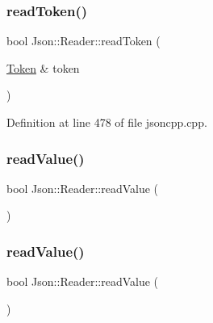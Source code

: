 \hypertarget{class_json_1_1_reader_a7cb0631963cc0fd4ff6ed0f570976864}{}\label{class_json_1_1_reader_a7cb0631963cc0fd4ff6ed0f570976864} 
\subsubsection{\texorpdfstring{read\+Token()}{readToken()}\hspace{0.1cm}{\footnotesize\ttfamily [2/2]}}
{\footnotesize\ttfamily bool Json\+::\+Reader\+::read\+Token (\begin{DoxyParamCaption}\item[{\hyperlink{class_json_1_1_reader_1_1_token}{Token} \&}]{token }\end{DoxyParamCaption})\hspace{0.3cm}{\ttfamily [private]}}



Definition at line 478 of file jsoncpp.\+cpp.

\hypertarget{class_json_1_1_reader_a47e56844b803d41ec993a83fadf4495c}{}\label{class_json_1_1_reader_a47e56844b803d41ec993a83fadf4495c} 
\subsubsection{\texorpdfstring{read\+Value()}{readValue()}\hspace{0.1cm}{\footnotesize\ttfamily [1/2]}}
{\footnotesize\ttfamily bool Json\+::\+Reader\+::read\+Value (\begin{DoxyParamCaption}{ }\end{DoxyParamCaption})\hspace{0.3cm}{\ttfamily [private]}}

\hypertarget{class_json_1_1_reader_a47e56844b803d41ec993a83fadf4495c}{}\label{class_json_1_1_reader_a47e56844b803d41ec993a83fadf4495c} 
\subsubsection{\texorpdfstring{read\+Value()}{readValue()}\hspace{0.1cm}{\footnotesize\ttfamily [2/2]}}
{\footnotesize\ttfamily bool Json\+::\+Reader\+::read\+Value (\begin{DoxyParamCaption}{ }\end{DoxyParamCaption})\hspace{0.3cm}{\ttfamily [private]}}



